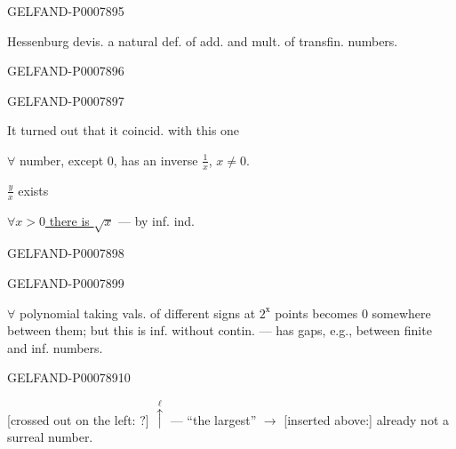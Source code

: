 \begin{GelfandAdjacentEvidence}{GELFAND-P000789}{5}


Hessenburg devis. a natural def. of add. and mult. of transfin. numbers.
\end{GelfandAdjacentEvidence}
\begin{GelfandAdjacentEvidence}{GELFAND-P000789}{6}

\end{GelfandAdjacentEvidence}
\begin{GelfandAdjacentEvidence}{GELFAND-P000789}{7}


It turned out that it coincid. with this one

\(\forall\) number, except \(0\), has an inverse \(\frac1x\), \(x\ne0\).

\(\frac yx\) exists

\underline{\(\forall x>0\) there is \(\sqrt{x}\)} --- by inf. ind.
\end{GelfandAdjacentEvidence}
\begin{GelfandAdjacentEvidence}{GELFAND-P000789}{8}

\end{GelfandAdjacentEvidence}
\begin{GelfandAdjacentEvidence}{GELFAND-P000789}{9}


\(\forall\) polynomial taking vals. of different signs at \(2^{\text{х}}\) points becomes \(0\) somewhere between them; but this is inf. without contin. --- has gaps, e.g., between finite and inf. numbers.
\end{GelfandAdjacentEvidence}
\begin{GelfandAdjacentEvidence}{GELFAND-P000789}{10}


[crossed out on the left: \sout{\(?\)}] \(\overset{\ell}{\uparrow}\) --- “the largest”
\(\longrightarrow\) [inserted above:] already not a surreal number.
\end{GelfandAdjacentEvidence}
